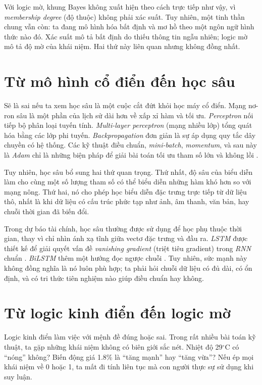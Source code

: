 Với logic mờ, khung Bayes không xuất hiện theo cách trực tiếp như vậy, vì \emph{membership degree} (độ thuộc) không phải xác suất. Tuy nhiên, một tinh thần chung vẫn còn: ta đang mô hình hóa bất định và mơ hồ theo một ngôn ngữ hình thức nào đó. Xác suất mô tả bất định do thiếu thông tin ngẫu nhiên; logic mờ mô tả độ mờ của khái niệm. Hai thứ này liên quan nhưng không đồng nhất.

\section{Từ mô hình cổ điển đến học sâu}

Sẽ là sai nếu ta xem học sâu là một cuộc cắt đứt khỏi học máy cổ điển. Mạng nơ-ron sâu là một phần của lịch sử dài hơn về xấp xỉ hàm và tối ưu. \emph{Perceptron} nối tiếp bộ phân loại tuyến tính. \emph{Multi-layer perceptron} (mạng nhiều lớp) tổng quát hóa bằng các lớp phi tuyến. \emph{Backpropagation} đơn giản là sự áp dụng quy tắc dây chuyền có hệ thống. Các kỹ thuật điều chuẩn, \emph{mini-batch}, \emph{momentum}, và sau này là \emph{Adam} chỉ là những biện pháp để giải bài toán tối ưu tham số lớn và không lồi \citep{goodfellow2016dl}.

Tuy nhiên, học sâu bổ sung hai thứ quan trọng. Thứ nhất, độ sâu của biểu diễn làm cho cùng một số lượng tham số có thể biểu diễn những hàm khó hơn so với mạng nông. Thứ hai, nó cho phép học biểu diễn đặc trưng trực tiếp từ dữ liệu thô, nhất là khi dữ liệu có cấu trúc phức tạp như ảnh, âm thanh, văn bản, hay chuỗi thời gian đã biến đổi.

Trong dự báo tài chính, học sâu thường được sử dụng để học phụ thuộc thời gian, thay vì chỉ nhìn ánh xạ tĩnh giữa vectơ đặc trưng và đầu ra. \emph{LSTM} được thiết kế để giải quyết vấn đề \emph{vanishing gradient} (triệt tiêu gradient) trong \emph{RNN} chuẩn \citep{hochreiter1997lstm}. \emph{BiLSTM} thêm một hướng đọc ngược chuỗi \citep{schuster1997brnn}. Tuy nhiên, sức mạnh này không đồng nghĩa là nó luôn phù hợp; ta phải hỏi chuỗi dữ liệu có đủ dài, có ổn định, và có tri thức tiên nghiệm nào giúp điều chuẩn hay không.

\section{Từ logic kinh điển đến logic mờ}

Logic kinh điển làm việc với mệnh đề đúng hoặc sai. Trong rất nhiều bài toán kỹ thuật, ta gặp những khái niệm không có biên giới sắc nét. Nhiệt độ 29$^\circ$C có ``nóng'' không? Biến động giá 1.8\% là ``tăng mạnh'' hay ``tăng vừa''? Nếu ép mọi khái niệm về 0 hoặc 1, ta mất đi tính liên tục mà con người thực sự sử dụng khi suy luận.

